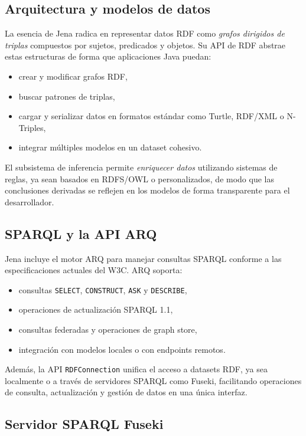 \documentclass{article}
\begin{document}
\subsection{Arquitectura y modelos de datos}

La esencia de Jena radica en representar datos RDF como \textit{grafos dirigidos de triplas} compuestos por sujetos, predicados y objetos. Su API de RDF abstrae estas estructuras de forma que aplicaciones Java puedan:

\begin{itemize}
    \item crear y modificar grafos RDF,
    \item buscar patrones de triplas,
    \item cargar y serializar datos en formatos estándar como Turtle, RDF/XML o N-Triples,
    \item integrar múltiples modelos en un dataset cohesivo.
\end{itemize}

El subsistema de inferencia permite \textit{enriquecer datos} utilizando sistemas de reglas, ya sean basados en RDFS/OWL o personalizados, de modo que las conclusiones derivadas se reflejen en los modelos de forma transparente para el desarrollador.

\subsection{SPARQL y la API ARQ}

Jena incluye el motor ARQ para manejar consultas SPARQL conforme a las especificaciones actuales del W3C. ARQ soporta:

\begin{itemize}
    \item consultas \texttt{SELECT}, \texttt{CONSTRUCT}, \texttt{ASK} y \texttt{DESCRIBE},
    \item operaciones de actualización SPARQL 1.1,
    \item consultas federadas y operaciones de graph store,
    \item integración con modelos locales o con endpoints remotos. 
\end{itemize}

Además, la API \texttt{RDFConnection} unifica el acceso a datasets RDF, ya sea localmente o a través de servidores SPARQL como Fuseki, facilitando operaciones de consulta, actualización y gestión de datos en una única interfaz. 

\subsection{Servidor SPARQL Fuseki}
\end{document}
